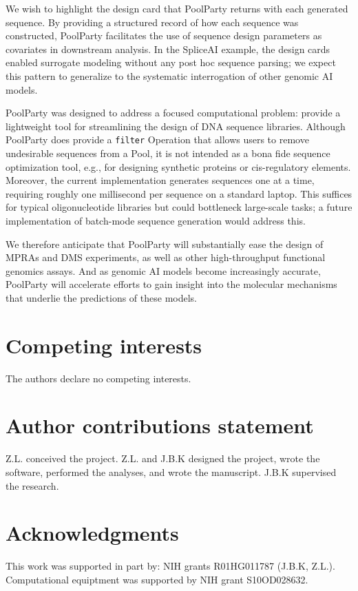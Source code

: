 \documentclass[unnumsec,webpdf,modern,large]{mam-authoring-template}%
\theoremstyle{thmstyleone}%
\theoremstyle{thmstyletwo}%
\theoremstyle{thmstylethree}%
\begin{document}
We wish to highlight the design card that PoolParty returns with each generated sequence. By providing a structured record of how each sequence was constructed, PoolParty facilitates the use of sequence design parameters as covariates in downstream analysis. In the SpliceAI example, the design cards enabled surrogate modeling without any post hoc sequence parsing; we expect this pattern to generalize to the systematic interrogation of other genomic AI models.

PoolParty was designed to address a focused computational problem: provide a lightweight tool for streamlining the design of DNA sequence libraries. Although PoolParty does provide a \texttt{filter} Operation that allows users to remove undesirable sequences from a Pool, it is not intended as a bona fide sequence optimization tool, e.g., for designing synthetic proteins or cis-regulatory elements. Moreover, the current implementation generates sequences one at a time, requiring roughly one millisecond per sequence on a standard laptop. This suffices for typical oligonucleotide libraries but could bottleneck large-scale tasks; a future implementation of batch-mode sequence generation would address this.

We therefore anticipate that PoolParty will substantially ease the design of MPRAs and DMS experiments, as well as other high-throughput functional genomics assays. And as genomic AI models become increasingly accurate, PoolParty will accelerate efforts to gain insight into the molecular mechanisms that underlie the predictions of these models. 

\section{Competing interests}
The authors declare no competing interests. 

\section{Author contributions statement}
Z.L. conceived the project. Z.L. and J.B.K designed the project, wrote the software, performed the analyses, and wrote the manuscript. J.B.K supervised the research. 

\section{Acknowledgments}
This work was supported in part by: NIH grants R01HG011787 (J.B.K, Z.L.). Computational equiptment was supported by NIH grant S10OD028632.


\end{document}
